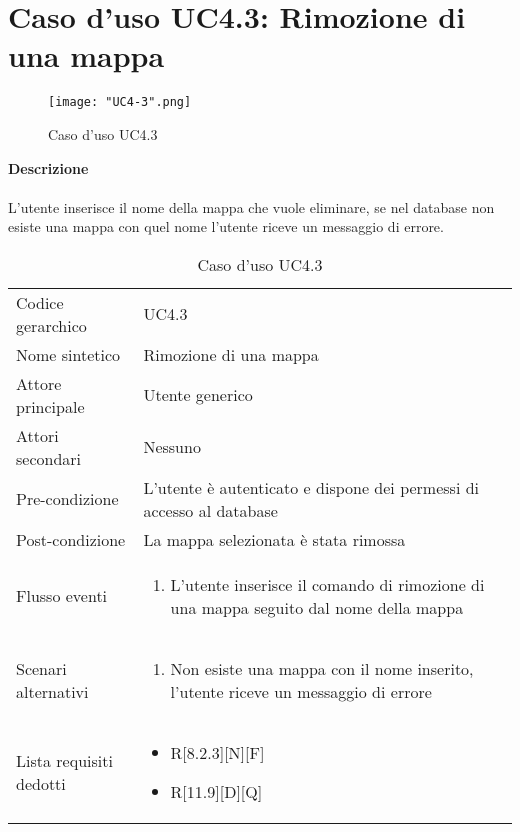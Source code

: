 \documentclass[a4paper]{report}
\begin{document}
	 \section{Caso d'uso UC4.3: Rimozione di una mappa}
	 \begin{figure}[H]
			\centering
			\texttt{[image: "UC4-3".png]}
			\caption{Caso d'uso UC4.3}
		\end{figure}
	 \textbf{Descrizione} \\ \\
	 L'utente inserisce il nome della mappa che vuole eliminare, se nel database non esiste una mappa con
	 quel nome l'utente riceve un messaggio di errore.
		\begin{table}[H]
		\begin{tabularx}{\textwidth}{X | X}\toprule
			\rowcolor{orange!65}Codice gerarchico & UC4.3\\
			Nome sintetico & Rimozione di una mappa\\
			\rowcolor{orange!65}Attore principale & Utente generico\\
			Attori secondari & Nessuno \\
			\rowcolor{orange!65}Pre-condizione & L'utente è autenticato e dispone dei permessi di accesso
			al database\\
			Post-condizione & La mappa selezionata è stata rimossa\\
			\rowcolor{orange!65}Flusso eventi & \begin{enumerate}
			\item L'utente inserisce il comando di rimozione di una mappa seguito dal nome della mappa
			\end{enumerate} \\
			Scenari alternativi & \begin{enumerate}
			\item Non esiste una mappa con il nome inserito, l'utente riceve un messaggio di errore
			\end{enumerate} \\
			\rowcolor{orange!65}Lista requisiti dedotti & \begin{itemize}
				\item R[8.2.3][N][F]
				\item R[11.9][D][Q]
				\end{itemize} \\
			\bottomrule
		\end{tabularx}
		\caption{Caso d'uso UC4.3}
	 \end{table}
\end{document}
